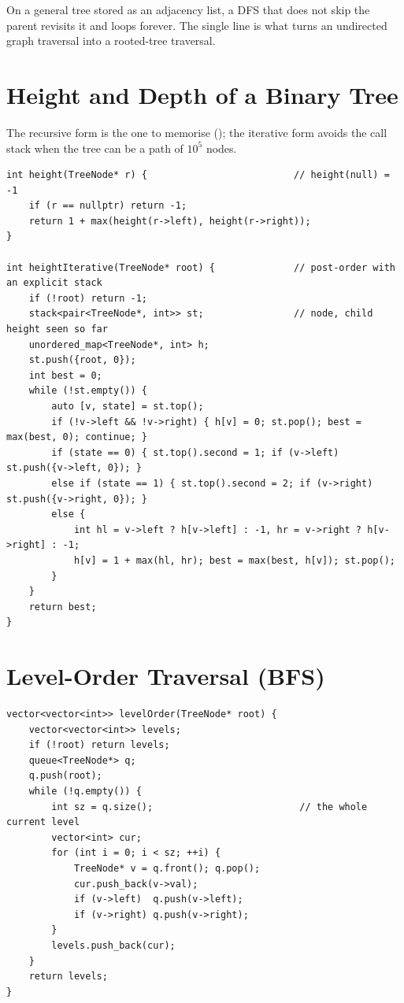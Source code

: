 \begin{warningbox}
On a general tree stored as an adjacency list, a DFS that does not skip the parent
revisits it and loops forever. The single line  is what
turns an undirected graph traversal into a rooted-tree traversal.
\end{warningbox}

\section{Height and Depth of a Binary Tree}

The recursive form is the one to memorise (); the iterative form
avoids the call stack when the tree can be a path of $10^5$ nodes.

\begin{lstlisting}[caption={Recursive and iterative height (Chapter 1)}, label={lst:app-height}]
int height(TreeNode* r) {                          // height(null) = -1
    if (r == nullptr) return -1;
    return 1 + max(height(r->left), height(r->right));
}

int heightIterative(TreeNode* root) {              // post-order with an explicit stack
    if (!root) return -1;
    stack<pair<TreeNode*, int>> st;                // node, child height seen so far
    unordered_map<TreeNode*, int> h;
    st.push({root, 0});
    int best = 0;
    while (!st.empty()) {
        auto [v, state] = st.top();
        if (!v->left && !v->right) { h[v] = 0; st.pop(); best = max(best, 0); continue; }
        if (state == 0) { st.top().second = 1; if (v->left) st.push({v->left, 0}); }
        else if (state == 1) { st.top().second = 2; if (v->right) st.push({v->right, 0}); }
        else {
            int hl = v->left ? h[v->left] : -1, hr = v->right ? h[v->right] : -1;
            h[v] = 1 + max(hl, hr); best = max(best, h[v]); st.pop();
        }
    }
    return best;
}
\end{lstlisting}

\section{Level-Order Traversal (BFS)}

\begin{lstlisting}[caption={Breadth-first traversal, level by level (Chapter 3)}, label={lst:app-bfs}]
vector<vector<int>> levelOrder(TreeNode* root) {
    vector<vector<int>> levels;
    if (!root) return levels;
    queue<TreeNode*> q;
    q.push(root);
    while (!q.empty()) {
        int sz = q.size();                          // the whole current level
        vector<int> cur;
        for (int i = 0; i < sz; ++i) {
            TreeNode* v = q.front(); q.pop();
            cur.push_back(v->val);
            if (v->left)  q.push(v->left);
            if (v->right) q.push(v->right);
        }
        levels.push_back(cur);
    }
    return levels;
}
\end{lstlisting}

